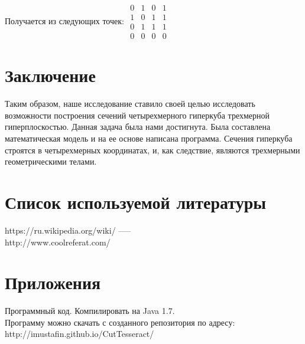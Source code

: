 \documentclass[12pt, a4paper, twoside]{report}
\begin{document}
Получается из следующих точек:
$
\begin{array}{cccc}
	0 & 1 & 0 & 1 \\
	1 & 0 & 1 & 1 \\
	0 & 1 & 1 & 1 \\
	0 & 0 & 0 & 0 
\end{array}
$

\section{Заключение}
Таким образом, наше исследование ставило своей целью исследовать возможности построения сечений четырехмерного гиперкуба трехмерной гиперплоскостью. Данная задача была нами достигнута. Была составлена математическая модель и на ее основе написана программа. Сечения гиперкуба строятся в четырехмерных координатах, и, как следствие, являются трехмерными геометрическими телами.
\section{Список используемой литературы}
https://ru.wikipedia.org/wiki/%
----- \\
http://www.coolreferat.com/%
\section{Приложения}
Программный код. Компилировать на Java 1.7. \\
Программу можно скачать с созданного репозитория по адресу: \\
http://imustafin.github.io/CutTesseract/ \\
\end{document}
